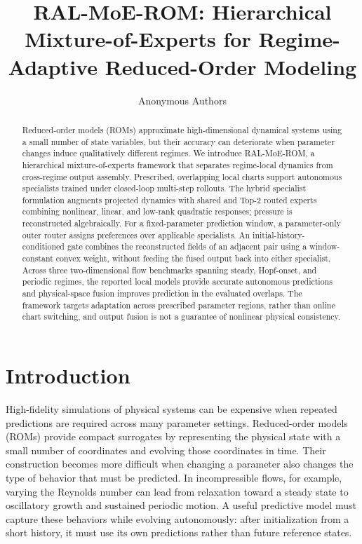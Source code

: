 \documentclass{article}
\title{RAL-MoE-ROM: Hierarchical Mixture-of-Experts for Regime-Adaptive Reduced-Order Modeling}
\author{Anonymous Authors}
\begin{document}
\raggedbottom

\maketitle

\begin{abstract}
Reduced-order models (ROMs) approximate high-dimensional dynamical systems using a small number of state variables, but their accuracy can deteriorate when parameter changes induce qualitatively different regimes. We introduce RAL-MoE-ROM, a hierarchical mixture-of-experts framework that separates regime-local dynamics from cross-regime output assembly. Prescribed, overlapping local charts support autonomous specialists trained under closed-loop multi-step rollouts. The hybrid specialist formulation augments projected dynamics with shared and Top-2 routed experts combining nonlinear, linear, and low-rank quadratic responses; pressure is reconstructed algebraically. For a fixed-parameter prediction window, a parameter-only outer router assigns preferences over applicable specialists. An initial-history-conditioned gate combines the reconstructed fields of an adjacent pair using a window-constant convex weight, without feeding the fused output back into either specialist. Across three two-dimensional flow benchmarks spanning steady, Hopf-onset, and periodic regimes, the reported local models provide accurate autonomous predictions and physical-space fusion improves prediction in the evaluated overlaps. The framework targets adaptation across prescribed parameter regions, rather than online chart switching, and output fusion is not a guarantee of nonlinear physical consistency.
\end{abstract}

\section{Introduction}

High-fidelity simulations of physical systems can be expensive when repeated predictions are required across many parameter settings. Reduced-order models (ROMs) provide compact surrogates by representing the physical state with a small number of coordinates and evolving those coordinates in time. Their construction becomes more difficult when changing a parameter also changes the type of behavior that must be predicted. In incompressible flows, for example, varying the Reynolds number can lead from relaxation toward a steady state to oscillatory growth and sustained periodic motion. A useful predictive model must capture these behaviors while evolving autonomously: after initialization from a short history, it must use its own predictions rather than future reference states.
\end{document}
